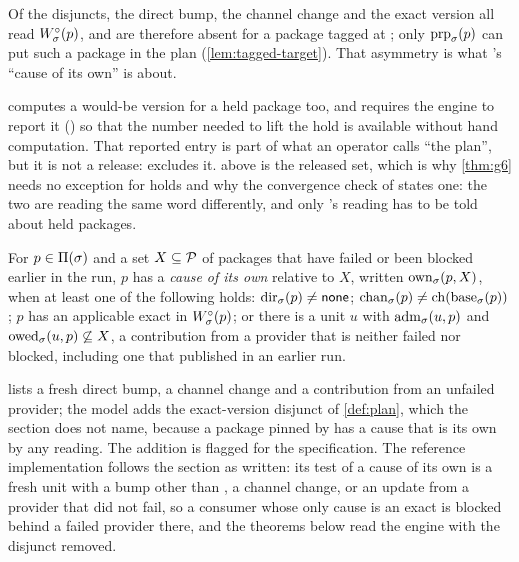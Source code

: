 Of the disjuncts, the direct bump, the channel change and the exact version
all read $W^{\circ}_{\sigma}(p)$, and are therefore absent for a package tagged at
\Head{}; only $\mathrm{prp}_{\sigma}(p)$ can put such a package in the plan
(\cref{lem:tagged-target}). That asymmetry is what 's ``cause of
its own'' is about.

\begin{remark}
\label{rem:plan-held}
 computes a would-be version for a held package too, and 
requires the engine to report it () so that the number needed to lift
the hold is available without hand computation. That reported entry is part of
what an operator calls ``the plan'', but it is not a release: 
excludes it. \plan{\st} above is the released set, which is why \cref{thm:g6}
needs no exception for holds and why the convergence check of  states
one: the two are reading the same word differently, and only 's
reading has to be told about held packages.
\end{remark}

\begin{definition}
\label{def:owncause}
For $p \in \Pi(\sigma)$ and a set $X \subseteq \mathcal{P}$ of packages that have
failed or been blocked earlier in the run, $p$ has a \emph{cause of its own}
relative to $X$, written $\mathrm{own}_{\sigma}(p,X)$, when at least one of the
following holds: $\mathrm{dir}_{\sigma}(p) \neq \mathsf{none}$; $\mathrm{chan}_{\sigma}(p) \neq
\mathrm{ch}(\mathrm{base}_{\sigma}(p))$; $p$ has an applicable exact  in
$W^{\circ}_{\sigma}(p)$; or there is a unit $u$ with $\mathrm{adm}_{\sigma}(u,p)$ and
$\mathrm{owed}_{\sigma}(u,p) \not\subseteq X$, a contribution from a provider that is
neither failed nor blocked, including one that published in an earlier run.
\end{definition}

 lists a fresh direct bump, a channel change and a contribution
from an unfailed provider; the model adds the exact-version disjunct of
\cref{def:plan}, which the section does not name, because a package pinned
by  has a cause that is its own by any reading. The
addition is flagged for the specification. The reference implementation
follows the section as written: its test of a cause of its own is a fresh unit
with a bump other than \bnone{}, a channel change, or an update from a
provider that did not fail, so a consumer whose only cause is an exact
 is blocked behind a failed provider there, and the
theorems below read the engine with the disjunct removed.


